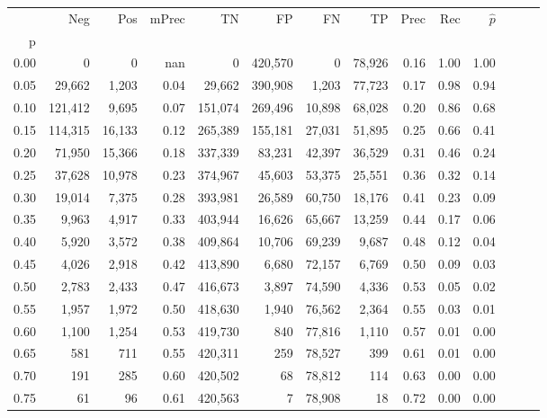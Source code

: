\begin{tabular}{rrrrrrrrrrrrrr}
\toprule
{} &      Neg &     Pos & mPrec &       TN &       FP &      FN &      TP &  Prec &   Rec & $\hat{p}$ \\
p    &          &         &       &          &          &         &         &       &       &           \\
\midrule
0.00 &        0 &       0 &   nan &        0 &  420,570 &       0 &  78,926 &  0.16 &  1.00 &      1.00 \\
0.05 &   29,662 &   1,203 &  0.04 &   29,662 &  390,908 &   1,203 &  77,723 &  0.17 &  0.98 &      0.94 \\
0.10 &  121,412 &   9,695 &  0.07 &  151,074 &  269,496 &  10,898 &  68,028 &  0.20 &  0.86 &      0.68 \\
0.15 &  114,315 &  16,133 &  0.12 &  265,389 &  155,181 &  27,031 &  51,895 &  0.25 &  0.66 &      0.41 \\
0.20 &   71,950 &  15,366 &  0.18 &  337,339 &   83,231 &  42,397 &  36,529 &  0.31 &  0.46 &      0.24 \\
0.25 &   37,628 &  10,978 &  0.23 &  374,967 &   45,603 &  53,375 &  25,551 &  0.36 &  0.32 &      0.14 \\
0.30 &   19,014 &   7,375 &  0.28 &  393,981 &   26,589 &  60,750 &  18,176 &  0.41 &  0.23 &      0.09 \\
0.35 &    9,963 &   4,917 &  0.33 &  403,944 &   16,626 &  65,667 &  13,259 &  0.44 &  0.17 &      0.06 \\
0.40 &    5,920 &   3,572 &  0.38 &  409,864 &   10,706 &  69,239 &   9,687 &  0.48 &  0.12 &      0.04 \\
0.45 &    4,026 &   2,918 &  0.42 &  413,890 &    6,680 &  72,157 &   6,769 &  0.50 &  0.09 &      0.03 \\
0.50 &    2,783 &   2,433 &  0.47 &  416,673 &    3,897 &  74,590 &   4,336 &  0.53 &  0.05 &      0.02 \\
0.55 &    1,957 &   1,972 &  0.50 &  418,630 &    1,940 &  76,562 &   2,364 &  0.55 &  0.03 &      0.01 \\
0.60 &    1,100 &   1,254 &  0.53 &  419,730 &      840 &  77,816 &   1,110 &  0.57 &  0.01 &      0.00 \\
0.65 &      581 &     711 &  0.55 &  420,311 &      259 &  78,527 &     399 &  0.61 &  0.01 &      0.00 \\
0.70 &      191 &     285 &  0.60 &  420,502 &       68 &  78,812 &     114 &  0.63 &  0.00 &      0.00 \\
0.75 &       61 &      96 &  0.61 &  420,563 &        7 &  78,908 &      18 &  0.72 &  0.00 &      0.00 \\

\end{tabular}
